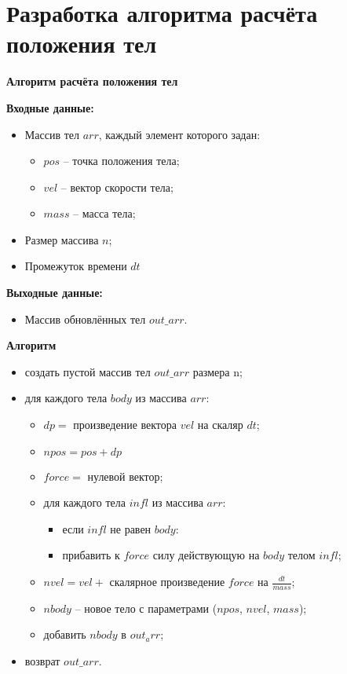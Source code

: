 \section{Разработка алгоритма расчёта положения тел}

\textbf{Алгоритм расчёта положения тел}

\textbf{Входные данные:}
\begin{itemize}
	\item Массив тел $arr$, каждый элемент которого задан:
	\begin{itemize}
		\item $pos$ -- точка положения тела;
		\item $vel$ -- вектор скорости тела;
		\item $mass$ -- масса тела;
	\end{itemize}
	\item Размер массива $n$;
	\item Промежуток времени $dt$
\end{itemize}

\textbf{Выходные данные:}
\begin{itemize}
	\item Массив обновлённых тел $out\_arr$.
\end{itemize}

\textbf{Алгоритм}
\begin{itemize}
	\item создать пустой массив тел $out\_arr$ размера n;
	\item для каждого тела $body$ из массива $arr$:
	\begin{itemize}
		\item $dp = $ произведение вектора $vel$ на скаляр $dt$;
		\item $npos = pos + dp$
		\item $force = $ нулевой вектор;
		\item для каждого тела $infl$ из массива $arr$:
		\begin{itemize}
			\item если $infl$ не равен $body$:
			\item прибавить к $force$ силу действующую на  $body$ телом $infl$;
		\end{itemize}
		\item $nvel = vel + $ скалярное произведение $force$ на $\frac{dt}{mass}$;
		\item $nbody$ -- новое тело с параметрами ($npos$, $nvel$, $mass$);
		\item добавить $nbody$ в $out_arr$;
	\end{itemize}
	\item возврат $out\_arr$.
\end{itemize}

